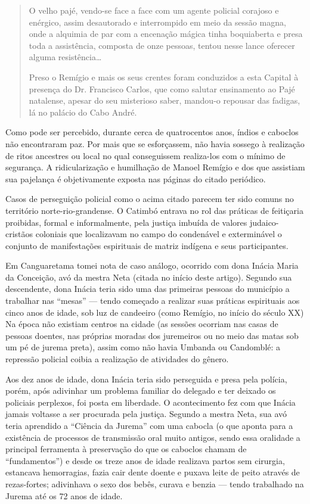 \begin{refsection}
\begin{quotation}
        O velho pajé, vendo-se face a face com um agente policial corajoso e enérgico, assim desautorado e interrompido em meio da sessão magna, onde a alquimia de par com a encenação mágica tinha boquiaberta e presa toda a assistência, composta de onze pessoas, tentou nesse lance oferecer alguma resistência\dots 

        Preso o Remígio e mais os seus crentes foram conduzidos a esta Capital à presença do Dr. Francisco Carlos, que como salutar ensinamento ao Pajé natalense, apesar do seu misterioso saber, mandou-o repousar das fadigas, lá no palácio do Cabo André. 
    \end{quotation}

    Como pode ser percebido, durante cerca de quatrocentos anos, índios e caboclos não encontraram paz. Por mais que se esforçassem, não havia sossego à realização de ritos ancestres ou local no qual conseguissem realiza-los com o mínimo de segurança. A ridicularização e humilhação de Manoel Remígio e dos que assistiam sua pajelança é objetivamente exposta nas páginas do citado periódico.  

    Casos de perseguição policial como o acima citado parecem ter sido comuns no território norte-rio-grandense. O Catimbó entrava no rol das práticas de feitiçaria proibidas, formal e informalmente, pela justiça imbuída de valores judaico-cristãos coloniais que localizavam no campo do condenável e exterminável o conjunto de manifestações espirituais de matriz indígena e seus participantes. 

    Em Canguaretama tomei nota de caso análogo, ocorrido com dona Inácia Maria da Conceição, avó da mestra Neta (citada no início deste artigo). Segundo sua descendente, dona Inácia teria sido uma das primeiras pessoas do município a trabalhar nas ``mesas'' --- tendo começado a realizar suas práticas espirituais aos cinco anos de idade, sob luz de candeeiro (como Remígio, no início do século XX) Na época não existiam centros na cidade (as sessões ocorriam nas casas de pessoas doentes, nas próprias moradas dos juremeiros ou no meio das matas sob um pé de jurema preta), assim como não havia Umbanda ou Candomblé: a repressão policial coibia a realização de atividades do gênero. 

    Aos dez anos de idade, dona Inácia teria sido perseguida e presa pela polícia, porém, após adivinhar um problema familiar do delegado e ter deixado os policiais perplexos, foi posta em liberdade. O acontecimento fez com que Inácia jamais voltasse a ser procurada pela justiça. Segundo a mestra Neta, sua avó teria aprendido a ``Ciência da Jurema'' com uma cabocla (o que aponta para a existência de processos de transmissão oral muito antigos, sendo essa oralidade a principal ferramenta à preservação do que os caboclos chamam de ``fundamentos'') e desde os treze anos de idade realizava partos sem cirurgia, estancava hemorragias, fazia cair dente doente e puxava leite de peito através de rezas-fortes; adivinhava o sexo dos bebês, curava e benzia --- tendo trabalhado na Jurema até os 72 anos de idade.


\end{refsection}
